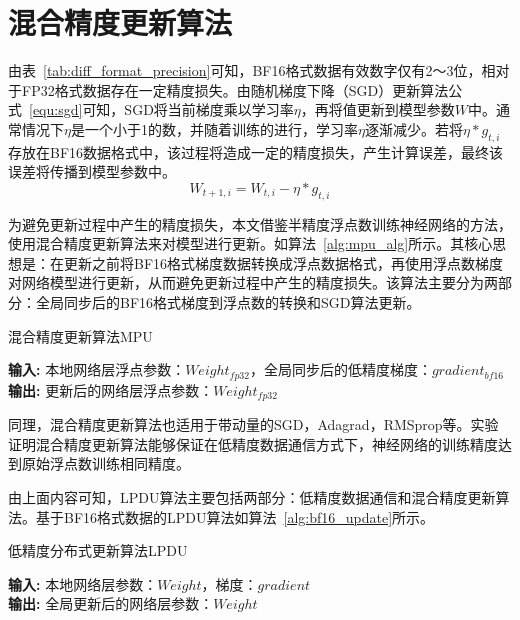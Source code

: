 \section{混合精度更新算法}

由表~\ref{tab:diff_format_precision}可知，BF16格式数据有效数字仅有2～3位，相对于FP32格式数据存在一定精度损失。由随机梯度下降（SGD）更新算法公式~\ref{equ:sgd}可知，SGD将当前梯度乘以学习率$\eta$，再将值更新到模型参数$W$中。通常情况下$\eta$是一个小于1的数，并随着训练的进行，学习率$\eta$逐渐减少。若将$\eta*g_{t,i}$存放在BF16数据格式中，该过程将造成一定的精度损失，产生计算误差，最终该误差将传播到模型参数中。
\begin{equation}
\label{equ:sgd}
W_{t+1,i}=W_{t,i}-\eta*g_{t,i}
\end{equation}

为避免更新过程中产生的精度损失，本文借鉴半精度浮点数训练神经网络的方法，使用混合精度更新算法来对模型进行更新。如算法~\ref{alg:mpu_alg}所示。其核心思想是：在更新之前将BF16格式梯度数据转换成浮点数据格式，再使用浮点数梯度对网络模型进行更新，从而避免更新过程中产生的精度损失。该算法主要分为两部分：全局同步后的BF16格式梯度到浮点数的转换和SGD算法更新。

\begin{algorithm}\small
\caption{混合精度更新算法MPU}
\textbf{输入:}
本地网络层浮点参数：$Weight_{fp32}$，全局同步后的低精度梯度：$gradient_{bf16}$ \\
\textbf{输出:} 
更新后的网络层浮点参数：$Weight_{fp32}$
\begin{algorithmic}[1]
\end{algorithmic}
	\label{alg:mpu_alg}
\end{algorithm}

同理，混合精度更新算法也适用于带动量的SGD，Adagrad，RMSprop等。实验证明混合精度更新算法能够保证在低精度数据通信方式下，神经网络的训练精度达到原始浮点数训练相同精度。

由上面内容可知，LPDU算法主要包括两部分：低精度数据通信和混合精度更新算法。基于BF16格式数据的LPDU算法如算法~\ref{alg:bf16_update}所示。

\begin{algorithm}\small
\caption{低精度分布式更新算法LPDU}
\textbf{输入:}
本地网络层参数：$Weight$，梯度：$gradient$ \\
\textbf{输出:} 
全局更新后的网络层参数：$Weight$
\begin{algorithmic}[1]
\end{algorithmic}
	\label{alg:bf16_update}
\end{algorithm}

